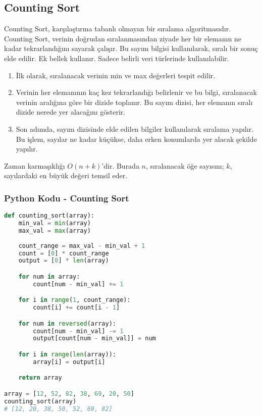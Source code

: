 \newpage

\subsection{Counting Sort}

Counting Sort, karşılaştırma tabanlı olmayan bir sıralama algoritmasıdır. Counting Sort, verinin doğrudan sıralanmasından ziyade her bir elemanın ne kadar tekrarlandığını sayarak çalışır. Bu sayım bilgisi kullanılarak, sıralı bir sonuç elde edilir. Ek bellek kullanır. Sadece belirli veri türlerinde kullanılabilir.

\begin{enumerate}
    \item İlk olarak, sıralanacak verinin min ve max değerleri tespit edilir.
    \item Verinin her elemanının kaç kez tekrarlandığı belirlenir ve bu bilgi, sıralanacak verinin aralığına göre bir dizide toplanır. Bu sayım dizisi, her elemanın sıralı dizide nerede yer alacağını gösterir.
    \item Son adımda, sayım dizisinde elde edilen bilgiler kullanılarak sıralama yapılır. Bu işlem, sayılar ne kadar küçükse, daha erken konumlarda yer alacak şekilde yapılır.
\end{enumerate}

Zaman karmaşıklığı $O(n + k)$'dir. Burada $n$, sıralanacak öğe sayısını; $k$, sayılardaki en büyük değeri temsil eder.

\subsubsection{Python Kodu - Counting Sort}

\begin{lstlisting}[language=Python]
def counting_sort(array):
    min_val = min(array)
    max_val = max(array)
    
    count_range = max_val - min_val + 1
    count = [0] * count_range
    output = [0] * len(array)

    for num in array:
        count[num - min_val] += 1

    for i in range(1, count_range):
        count[i] += count[i - 1]

    for num in reversed(array):
        count[num - min_val] -= 1
        output[count[num - min_val]] = num

    for i in range(len(array)):
        array[i] = output[i]

    return array

array = [12, 52, 82, 38, 69, 20, 50]
counting_sort(array)
# [12, 20, 38, 50, 52, 69, 82]
\end{lstlisting}


